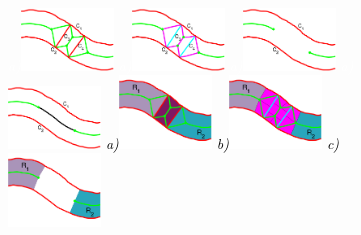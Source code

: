 \begin{figure}[!ht]
\centering
{\footnotesize\textit{\textcolor{white}{a)}}}\includegraphics[width=0.22\textwidth]{figs/rr_l1.pdf} 
{\footnotesize\textit{\textcolor{white}{a)}}}\includegraphics[width=0.22\textwidth]{figs/rr_l2.pdf}  
{\footnotesize\textit{\textcolor{white}{a)}}}\includegraphics[width=0.22\textwidth]{figs/rr_l3.pdf} 
{\footnotesize\textit{\textcolor{white}{a)}}}\includegraphics[width=0.22\textwidth]{figs/rr_l4.pdf} 
{\footnotesize\textit{\textcolor{black}{a)}}}\includegraphics[width=0.22\textwidth]{figs/rr_l5.pdf}
{\footnotesize\textit{\textcolor{black}{b)}}}\includegraphics[width=0.22\textwidth]{figs/rr_l6.pdf}
{\footnotesize\textit{\textcolor{black}{c)}}}\includegraphics[width=0.22\textwidth]{figs/rr_l7.pdf}

\end{figure}
